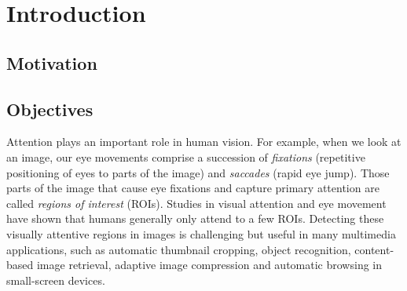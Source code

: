 \chapter{Introduction}

\section{Motivation}
\section{Objectives}
\label{c:intro}


Attention plays an important role in human vision. For example, when
we look at an image, our eye movements comprise a succession of {\em
fixations} (repetitive positioning of eyes to parts of the image)
and {\em saccades} (rapid eye jump). Those parts of the image that
cause eye fixations and capture primary attention are called {\em
regions of interest} (ROIs). Studies in visual attention and eye
movement have shown that humans generally only attend to a few ROIs.
Detecting these visually attentive regions in images is challenging
but useful in many multimedia applications, such as automatic
thumbnail cropping, object recognition, content-based image
retrieval, adaptive image compression and automatic browsing in
small-screen devices.

